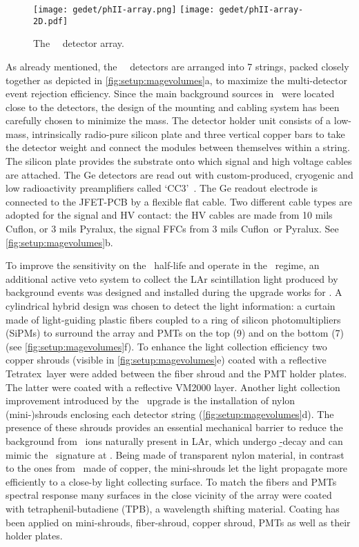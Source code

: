 \begin{figure}
  \centering
  \texttt{[image: gedet/phII-array.png]}
  \hspace{0.5cm}
  \texttt{[image: gedet/phII-array-2D.pdf]}
  \caption{%
    The \gerda\ \phasetwo\ detector array.
  }\label{fig:setup:array}
\end{figure}

As already mentioned, the \gerda\ \phasetwo\ detectors are arranged into 7 strings, packed
closely together as depicted in \cref{fig:setup:magevolumes}a, to maximize the
multi-detector event rejection efficiency. Since the main background sources in
\phaseone\ were located close to the detectors, the design of the mounting and cabling
system has been carefully chosen to minimize the mass. The detector holder unit consists
of a low-mass, intrinsically radio-pure silicon plate and three vertical copper bars to
take the detector weight and connect the modules between themselves within a string. The
silicon plate provides the substrate onto which signal and high voltage cables are
attached. The Ge detectors are read out with custom-produced, cryogenic and low
radioactivity preamplifiers called `CC3'~\cite{Riboldi2015}. The Ge readout electrode is
connected to the JFET-PCB by a flexible flat cable. Two different cable types are adopted
for the signal and HV contact: the HV cables are made from 10 mils Cuflon\reg, or 3 mils
Pyralux\reg, the signal FFCs from 3 mils Cuflon\reg\ or Pyralux\reg. See
\cref{fig:setup:magevolumes}b.

To improve the sensitivity on the \onbb\ half-life and operate in the \bkgfree\ regime, an
additional active veto system to collect the LAr scintillation light produced by
background events was designed and installed during the upgrade works for \phasetwo. A
cylindrical hybrid design was chosen to detect the light information: a curtain made of
light-guiding plastic fibers coupled to a ring of silicon photomultipliers (SiPMs) to
surround the array and PMTs on the top (9) and on the bottom (7) (see
\cref{fig:setup:magevolumes}f). To enhance the light collection efficiency two copper
shrouds (visible in \cref{fig:setup:magevolumes}e) coated with a reflective Tetratex\reg\
layer were added between the fiber shroud and the PMT holder plates. The latter were
coated with a reflective VM2000 layer. Another light collection improvement introduced by
the \phasetwo\ upgrade is the installation of nylon (mini-)shrouds enclosing each detector
string (\cref{fig:setup:magevolumes}d). The presence of these shrouds provides an
essential mechanical barrier to reduce the background from \kvz\ ions naturally present in
LAr, which undergo \b-decay and can mimic the \onbb\ signature at \qbb. Being made of
transparent nylon material, in contrast to the ones from \phaseone\ made of copper, the
mini-shrouds let the light propagate more efficiently to a close-by light collecting
surface. To match the fibers and PMTs spectral response many surfaces in the close vicinity
of the array were coated with tetraphenil-butadiene (TPB), a wavelength shifting material.
Coating has been applied on mini-shrouds, fiber-shroud, copper shroud, PMTs as well as
their holder plates.

